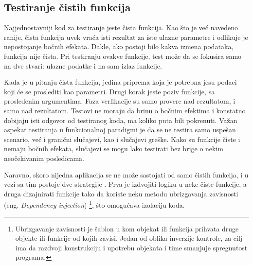 \documentclass[12pt,oneside]{memoir}
\begin{document}
\subsection{Testiranje čistih funkcija}
\par Najjednostavniji kod za testiranje jeste čista funkcija. Kao što je već navedeno ranije, čista funkcija uvek vraća isti rezultat za iste ulazne parametre i odlikuje je nepostojanje bočnih efekata. Dakle, ako postoji bilo kakva izmena podataka, funkcija nije čista. Pri testiranju ovakve funkcije, test može da se fokusira samo na dve stvari: ulazne podatke i na sam izlaz funkcije. 
\par Kada je u pitanju čista funkcija, jedina priprema koja je potrebna jesu podaci koji će se proslediti kao parametri. Drugi korak jeste poziv funkcije, sa prosleđenim argumentima. Faza verfikacije su samo provere nad rezultatom, i samo nad rezultatom. Testovi ne moraju da brinu o bočnim efektima i konstatno dobijaju isti odgovor od testiranog koda, ma koliko puta bili pokrenuti. Važan aspekat testiranja u funkcionalnoj paradigmi je da se ne testira samo uspešan scenario, već i granični slučajevi, kao i slučajevi greške. Kako su funkcije čiste i nemaju bočnih efekata, slučajevi se mogu lako testirati bez brige o nekim neočekivanim posledicama. 
\par Naravno, skoro nijedna aplikacija se ne može sastojati od samo čistih funkcija, i u vezi sa tim postoje dve strategije \cite{testingelixir} . Prva je izdvojiti logiku u neke čiste funkcije, a druga dizajnirati funkcije tako da koriste neku metodu ubrizgavanja zavisnosti (eng. \textit{Dependency injection}) \footnote{Ubrizgavanje zavisnosti je šablon u kom objekat ili funkcija prihvata druge objekte ili funkcije od kojih zavisi. Jedan od oblika inverzije kontrole, za cilj ima da razdvoji konstrukciju i upotrebu objekata i time smanjuje spregnutost programa.}, što omogućava izolaciju koda.
\end{document}
